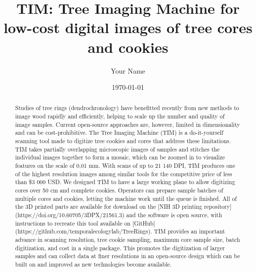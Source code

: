 \documentclass[a4paper,12pt]{article}
\title{TIM: Tree Imaging Machine for low-cost digital images of tree cores and cookies}
\author{Your Name}
\date{\today}
\begin{document}
\maketitle


\begin{abstract} 
Studies of tree rings (dendrochronology) have benefitted recently from new methods to image wood rapidly and efficiently, helping to scale up the number and quality of image samples. Current open-source approaches are, however, limited in dimensionality and can be cost-prohibitive. The Tree Imaging Machine (TIM) is a do-it-yourself scanning tool made to digitize tree cookies and cores that address these limitations. TIM takes partially overlapping microscopic images of samples and stitches the individual images together to form 
a mosaic, which can be zoomed in to visualize features on the scale of 0.01 mm. With scans of up to 21 140 DPI, TIM produces one of the highest resolution images among similar tools for the competitive price of less than \$3 000 USD.
We designed TIM to have a large working plane to allow digitizing cores over 50 cm and complete cookies. Operators can prepare sample batches of multiple cores and cookies, letting the machine work until the queue is finished.
All of the 3D printed parts are available for download on the [NIH 3D printing repository](https://doi.org/10.60705/3DPX/21561.3) and the software is 
open source, with instructions to recreate this tool available on [GitHub](https://github.com/temporalecologylab/TreeRings). TIM provides an important advance in scanning resolution, tree cookie sampling, maximum core sample size, batch digitization, and cost in a single package. This promotes the digitization of larger samples and can collect data at finer resolutions in an open-source design which can be built on and improved as new technologies become available. %
\end{abstract}
\end{document}
